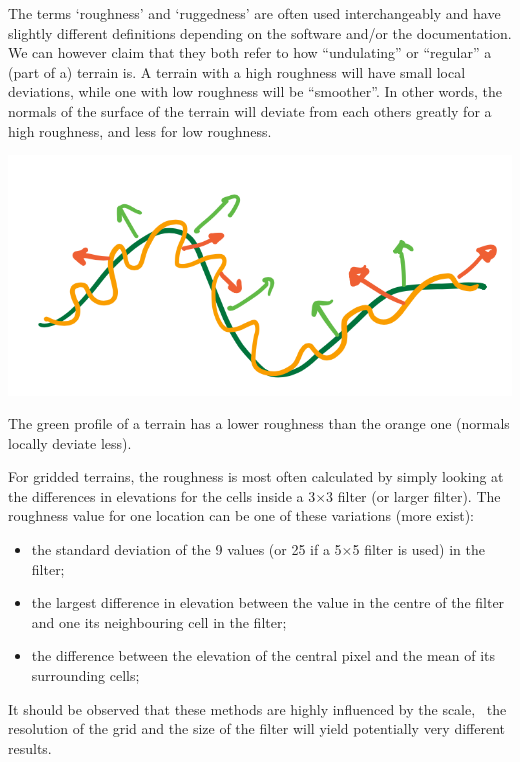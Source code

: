 The terms `roughness' and `ruggedness' are often used interchangeably and have slightly different definitions depending on the software and/or the documentation.
We can however claim that they both refer to how ``undulating'' or ``regular'' a (part of a) terrain is.
A terrain with a high roughness will have small local deviations, while one with low roughness will be ``smoother''.
In other words, the normals of the surface of the terrain will deviate from each others greatly for a high roughness, and less for low roughness.
\begin{marginfigure}
  \centering
  \includegraphics[width=\linewidth]{figs/roughness}
  \caption{The green profile of a terrain has a lower roughness than the orange one (normals locally deviate less).}%
\label{fig:roughness}
\end{marginfigure}

For gridded terrains, the roughness is most often calculated by simply looking at the differences in elevations for the cells inside a 3$\times$3 filter (or larger filter).
The roughness value for one location can be one of these variations (more exist):
\begin{itemize}
  \item the standard deviation of the 9 values (or 25 if a 5$\times$5 filter is used) in the filter;
  \item the largest difference in elevation between the value in the centre of the filter and one its neighbouring cell in the filter;
  \item the difference between the elevation of the central pixel and the mean of its surrounding cells;
\end{itemize}

It should be observed that these methods are highly influenced by the scale, \ie\ the resolution of the grid and the size of the filter will yield potentially very different results.

